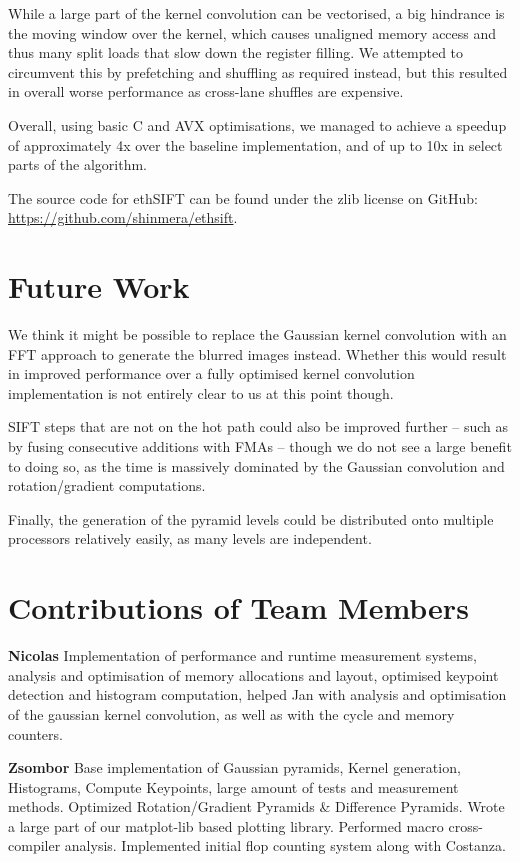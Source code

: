 \documentclass[letterpaper]{article}
\begin{document}
While a large part of the kernel convolution can be vectorised, a big hindrance is the moving window over the kernel, which causes unaligned memory access and thus many split loads that slow down the register filling. We attempted to circumvent this by prefetching and shuffling as required instead, but this resulted in overall worse performance as cross-lane shuffles are expensive.

Overall, using basic C and AVX optimisations, we managed to achieve a speedup of approximately 4x over the baseline implementation, and of up to 10x in select parts of the algorithm.

The source code for ethSIFT can be found under the zlib license on GitHub: \\\url{https://github.com/shinmera/ethsift}.

\section{Future Work}
We think it might be possible to replace the Gaussian kernel convolution with an FFT approach to generate the blurred images instead. Whether this would result in improved performance over a fully optimised kernel convolution implementation is not entirely clear to us at this point though.

SIFT steps that are not on the hot path could also be improved further -- such as by fusing consecutive additions with FMAs -- though we do not see a large benefit to doing so, as the time is massively dominated by the Gaussian convolution and rotation/gradient computations.

Finally, the generation of the pyramid levels could be distributed onto multiple processors relatively easily, as many levels are independent.

\section{Contributions of Team Members}
\textbf{Nicolas} Implementation of performance and runtime measurement systems, analysis and optimisation of memory allocations and layout, optimised keypoint detection and histogram computation, helped Jan with analysis and optimisation of the gaussian kernel convolution, as well as with the cycle and memory counters.

\textbf{Zsombor} Base implementation of Gaussian pyramids, Kernel generation, Histograms, Compute Keypoints, large amount of tests and measurement methods. Optimized Rotation/Gradient Pyramids \& Difference Pyramids. Wrote a large part of our matplot-lib based plotting library. Performed macro cross-compiler analysis. Implemented initial flop counting system along with Costanza.
\end{document}
